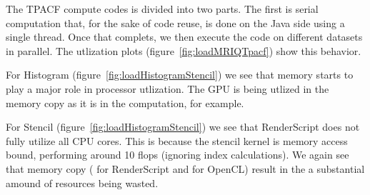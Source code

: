 \FloatBarrier

The TPACF compute codes is divided into two parts.
The first is serial computation that, for the sake of code reuse, is done on the 
  Java side using a single thread.
Once that complets, we then execute the code on different datasets in parallel.
The utlization plots (figure~\ref{fig:loadMRIQTpacf}) show this behavior.  

For Histogram (figure~\ref{fig:loadHistogramStencil}) we see that memory starts
  to play a major role in processor utlization.
The GPU is being utlized in the memory copy as it is in the computation, for example.

For Stencil (figure~\ref{fig:loadHistogramStencil}) we see that RenderScript does
  not fully utilize all CPU cores.
This is because the stencil kernel is memory access bound, performing around 10 flops 
  (ignoring index calculations).
We again see that memory copy ( for RenderScript and
   for OpenCL) result in the a substantial amound of resources being
  wasted.

